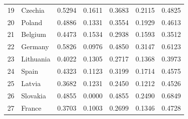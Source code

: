 \begin{table}[htbp]
\begin{tabular*}{\textwidth}{@{\extracolsep{\fill}}
  r l
  S[table-format=1.4]
  S[table-format=1.4]
  S[table-format=1.4]
  S[table-format=1.4]
  S[table-format=1.4]
  @{}}
  19 & Czechia & 0.5294 & 0.1611 & 0.3683 & 0.2115 & 0.4825 \\
  20 & Poland & 0.4886 & 0.1331 & 0.3554 & 0.1929 & 0.4613 \\
  21 & Belgium & 0.4473 & 0.1534 & 0.2938 & 0.1593 & 0.3512 \\
  22 & Germany & 0.5826 & 0.0976 & 0.4850 & 0.3147 & 0.6123 \\
  23 & Lithuania & 0.4022 & 0.1305 & 0.2717 & 0.1368 & 0.3973 \\
  24 & Spain & 0.4323 & 0.1123 & 0.3199 & 0.1714 & 0.4575 \\
  25 & Latvia & 0.3682 & 0.1231 & 0.2450 & 0.1212 & 0.4526 \\
  26 & Slovakia & 0.4855 & 0.0000 & 0.4855 & 0.2490 & 0.6849 \\
  27 & France & 0.3703 & 0.1003 & 0.2699 & 0.1346 & 0.4728 \\
\bottomrule
\end{tabular*}
\end{table}
